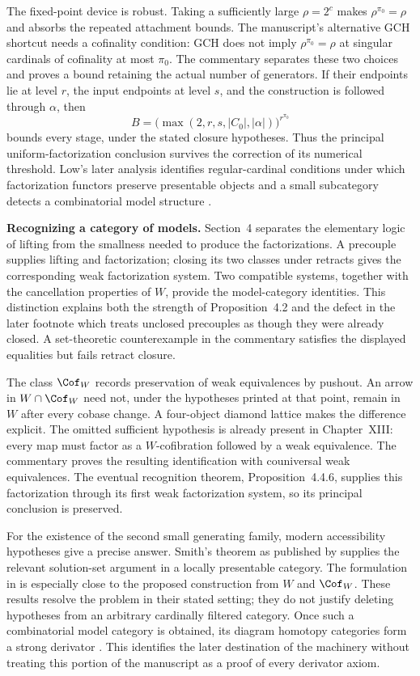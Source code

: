 The fixed-point device is robust. Taking a sufficiently large $\rho=2^c$ makes $\rho^{\pi_0}=\rho$ and absorbs the repeated attachment bounds. The manuscript's alternative GCH shortcut needs a cofinality condition: GCH does not imply $\rho^{\pi_0}=\rho$ at singular cardinals of cofinality at most $\pi_0$. The commentary separates these two choices and proves a bound retaining the actual number of generators. If their endpoints lie at level $r$, the input endpoints at level $s$, and the construction is followed through $\alpha$, then
\[
 B=\bigl(\max(2,r,s,|C_0|,|\alpha|)\bigr)^{r^{\pi_0}}
\]
bounds every stage, under the stated closure hypotheses. Thus the principal uniform-factorization conclusion survives the correction of its numerical threshold. Low's later analysis identifies regular-cardinal conditions under which factorization functors preserve presentable objects and a small subcategory detects a combinatorial model structure \citep[Theorem~4.4, Theorem~5.9, Proposition~5.12]{Low2016Heart}.

\medskip\noindent\textbf{Recognizing a category of models.}
Section~4 separates the elementary logic of lifting from the smallness needed to produce the factorizations. A precouple supplies lifting and factorization; closing its two classes under retracts gives the corresponding weak factorization system. Two compatible systems, together with the cancellation properties of $W$, provide the model-category identities. This distinction explains both the strength of Proposition~4.2 and the defect in the later footnote which treats unclosed precouples as though they were already closed. A set-theoretic counterexample in the commentary satisfies the displayed equalities but fails retract closure.

The class $\Cof_W$ records preservation of weak equivalences by pushout. An arrow in $W\cap\Cof_W$ need not, under the hypotheses printed at that point, remain in $W$ after every cobase change. A four-object diamond lattice makes the difference explicit. The omitted sufficient hypothesis is already present in Chapter~XIII: every map must factor as a $W$-cofibration followed by a weak equivalence. The commentary proves the resulting identification with couniversal weak equivalences. The eventual recognition theorem, Proposition~4.4.6, supplies this factorization through its first weak factorization system, so its principal conclusion is preserved.

For the existence of the second small generating family, modern accessibility hypotheses give a precise answer. Smith's theorem as published by \citet[Theorem~1.7 and Proposition~1.15]{Beke2000} supplies the relevant solution-set argument in a locally presentable category. The formulation in \citet[Proposition~A.2.6.15, updated online version]{Lurie2009HTT} is especially close to the proposed construction from $W$ and $\Cof_W$. These results resolve the problem in their stated setting; they do not justify deleting hypotheses from an arbitrary cardinally filtered category. Once such a combinatorial model category is obtained, its diagram homotopy categories form a strong derivator \citep[Proposition~1.30]{Groth2013}. This identifies the later destination of the machinery without treating this portion of the manuscript as a proof of every derivator axiom.


